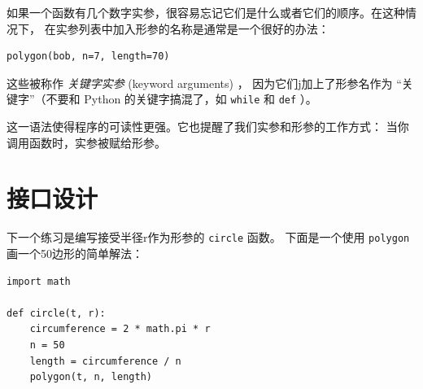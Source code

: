
如果一个函数有几个数字实参，很容易忘记它们是什么或者它们的顺序。在这种情况下，
在实参列表中加入形参的名称是通常是一个很好的办法：

\begin{lstlisting}
polygon(bob, n=7, length=70)
\end{lstlisting}


这些被称作 \emph{关键字实参} (keyword arguments) ，
因为它们j加上了形参名作为 ``关键字''（不要和 Python 的关键字搞混了，如 \lstinline{while} 和 \lstinline{def} ）。
  


这一语法使得程序的可读性更强。它也提醒了我们实参和形参的工作方式：
当你调用函数时，实参被赋给形参。

\section{接口设计}


下一个练习是编写接受半径r作为形参的 \lstinline{circle} 函数。
下面是一个使用 \lstinline{polygon} 画一个50边形的简单解法：

\begin{lstlisting}
import math

def circle(t, r):
    circumference = 2 * math.pi * r
    n = 50
    length = circumference / n
    polygon(t, n, length)
\end{lstlisting}

